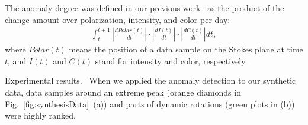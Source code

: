 The anomaly degree was defined in our previous work~\cite{Sawada2018} as the product of the change amount over polarization, intensity, and color per day:
\begin{equation*}
\begin{split}
  \int_t^{t + 1}\left|\frac{dPolar(t)}{dt}\right|\cdot\left|\frac{dI(t)}{dt}\right|\cdot\left|\frac{dC(t)}{dt}\right|dt,
  \label{eq:anomaly}
\end{split}
\end{equation*}
where $Polar(t)$ means the position of a data sample on the Stokes plane at time $t$, and $I(t)$ and $C(t)$ stand for intensity and color, respectively. 

\textsf{Experimental results.\ } When we applied the anomaly detection to our synthetic data, 
data samples around an extreme peak (orange diamonds in Fig.~\ref{fig:synthesisData}~(a)) and parts of dynamic rotations (green plots in (b)) were highly ranked.


%
%
